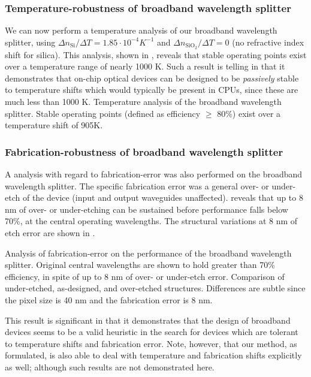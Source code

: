 \documentclass[letterpaper,10pt]{article}
\begin{document}
\subsubsection{Temperature-robustness of broadband wavelength splitter}
We can now perform a temperature analysis of our broadband wavelength splitter,
    using $\Delta n_\text{Si} / \Delta T = 1.85 \cdot 10^{-4} K^{-1}$ 
    and $\Delta n_{\text{SiO}_2} / \Delta T = 0$ 
    (no refractive index shift for silica).
This analysis, shown in ,
    reveals that stable operating points exist
    over a temperature range of nearly 1000 K.
Such a result is telling in that it demonstrates
    that on-chip optical devices can be designed to be \emph{passively} stable
    to temperature shifts which would typically be present in CPUs,
    since these are much less than 1000 K.
    {Temperature analysis of the broadband wavelength splitter.
    Stable operating points (defined as efficiency $\ge$ 80\%)
    exist over a temperature shift of 905K.}

\subsubsection{Fabrication-robustness of broadband wavelength splitter}
A analysis with regard to fabrication-error
    was also performed on the broadband wavelength splitter.
The specific fabrication error was a general over- or under-etch
    of the device (input and output waveguides unaffected).
 reveals that up to 8 nm of over- or under-etching
    can be sustained before performance falls below 70\%, at the central
    operating wavelengths.
The structural variations at 8 nm of etch error are shown in .
    
    {Analysis of fabrication-error on the performance of the broadband 
    wavelength splitter.
    Original central wavelengths are shown to hold greater than 70\% efficiency,
    in spite of up to 8 nm of over- or under-etch error.}
    {Comparison of under-etched, as-designed, and over-etched structures.
    Differences are subtle since the pixel size is 40 nm and the
    fabrication error is 8 nm.}

This result is significant in that it demonstrates
    that the design of broadband devices
    seems to be a valid heuristic in the search for 
    devices which are tolerant to temperature shifts and fabrication error.
Note, however, that our method, as formulated, is also able to
    deal with temperature and fabrication shifts explicitly as well;
    although such results are not demonstrated here.
\end{document}
